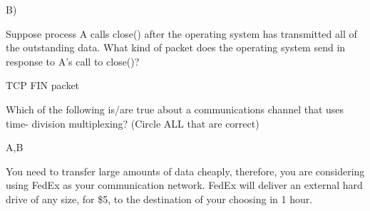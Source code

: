\documentclass[answers,addpoints]{exam}
\begin{document}
\begin{questions}

\begin{solution}
B)
\end{solution}

\question
Suppose process A calls close() after the operating system has transmitted all of the outstanding data. What kind of packet does the operating system send in response to A’s call to close()? 
 \fillwithdottedlines{0.5in}
 
 \begin{solution}
 TCP FIN packet
 \end{solution}


\question
Which of the following is/are true about a communications channel that uses time- division multiplexing? (Circle ALL that are correct)
\begin{solution}
A,B
\end{solution}

\question 
You need to transfer large amounts of data cheaply, therefore, you are considering using FedEx as your communication network. FedEx will deliver an external hard drive of any size, for \$5, to the destination of your choosing in 1 hour. 


\end{questions}
\end{document}
